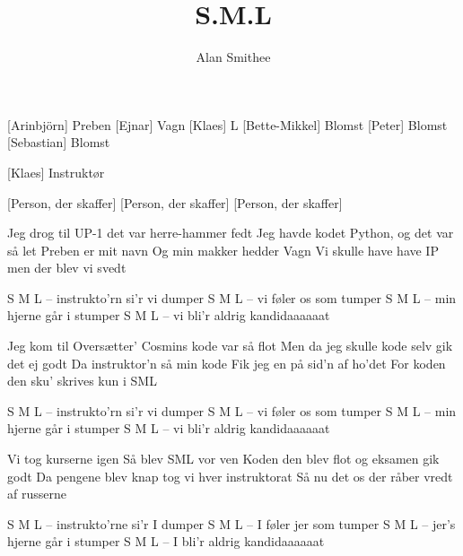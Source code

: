 \documentclass[a4paper,11pt]{article}
\title{S.M.L}
\author{Alan Smithee}
\begin{document}
\maketitle

\begin{roles}
  [Arinbjörn] Preben
  [Ejnar] Vagn
  [Klaes] L
  [Bette-Mikkel] Blomst
  [Peter] Blomst
  [Sebastian] Blomst

  [Klaes] Instruktør
\end{roles}

\begin{props}
  [Person, der skaffer]
  [Person, der skaffer]
  [Person, der skaffer]
\end{props}

\begin{song}
  Jeg drog til UP-1
  det var herre-hammer fedt
  Jeg havde kodet Python, og det var så let
  Preben er mit navn
  Og min makker hedder Vagn
  Vi skulle have have IP men der blev vi svedt

  S M L -- instrukto'rn si'r vi dumper
  S M L -- vi føler os som tumper
  S M L -- min hjerne går i stumper
  S M L -- vi bli'r aldrig kandidaaaaaat

  Jeg kom til Oversætter'
  Cosmins kode var så flot
  Men da jeg skulle kode selv
  gik det ej godt
  Da instruktor'n så min kode
  Fik jeg en på sid'n af ho'det
  For koden den sku' skrives kun i SML

  S M L -- instrukto'rn si'r vi dumper
  S M L -- vi føler os som tumper
  S M L -- min hjerne går i stumper
  S M L -- vi bli'r aldrig kandidaaaaaat

  Vi tog kurserne igen
  Så blev SML vor ven
  Koden den blev flot
  og eksamen gik godt
  Da pengene blev knap
  tog vi hver instruktorat
  Så nu det os der råber vredt af russerne

  S M L -- instrukto'rne si'r I dumper
  S M L -- I føler jer som tumper
  S M L -- jer's hjerne går i stumper
  S M L -- I bli'r aldrig kandidaaaaaat
\end{song}
\end{document}
